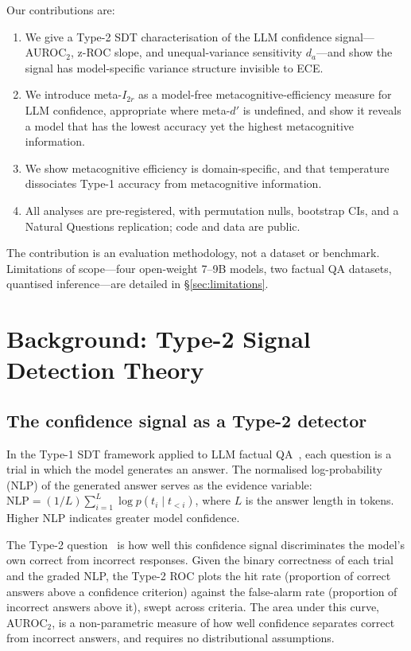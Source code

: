 \documentclass{article}
\begin{document}
Our contributions are:
\begin{enumerate}[leftmargin=*, nosep]
    \item We give a Type-2 SDT characterisation of the LLM confidence signal---AUROC$_2$, z-ROC slope, and unequal-variance sensitivity $d_a$---and show the signal has model-specific variance structure invisible to ECE.
    \item We introduce meta-$I_{2r}$ as a model-free metacognitive-efficiency measure for LLM confidence, appropriate where meta-$d'$ is undefined, and show it reveals a model that has the lowest accuracy yet the highest metacognitive information.
    \item We show metacognitive efficiency is domain-specific, and that temperature dissociates Type-1 accuracy from metacognitive information.
    \item All analyses are pre-registered, with permutation nulls, bootstrap CIs, and a Natural Questions replication; code and data are public.
\end{enumerate}

The contribution is an evaluation methodology, not a dataset or benchmark. Limitations of scope---four open-weight 7--9B models, two factual QA datasets, quantised inference---are detailed in \S\ref{sec:limitations}.

\section{Background: Type-2 Signal Detection Theory}

\subsection{The confidence signal as a Type-2 detector}

In the Type-1 SDT framework applied to LLM factual QA~\citep{cacioli2026llms}, each question is a trial in which the model generates an answer. The normalised log-probability (NLP) of the generated answer serves as the evidence variable: $\text{NLP} = (1/L) \sum_{i=1}^{L} \log p(t_i \mid t_{<i})$, where $L$ is the answer length in tokens. Higher NLP indicates greater model confidence.

The Type-2 question~\citep{galvin2003type} is how well this confidence signal discriminates the model's own correct from incorrect responses. Given the binary correctness of each trial and the graded NLP, the Type-2 ROC plots the hit rate (proportion of correct answers above a confidence criterion) against the false-alarm rate (proportion of incorrect answers above it), swept across criteria. The area under this curve, AUROC$_2$, is a non-parametric measure of how well confidence separates correct from incorrect answers, and requires no distributional assumptions.
\end{document}
